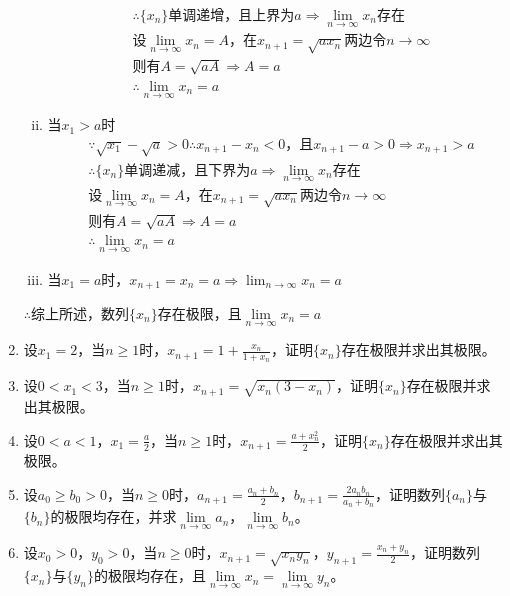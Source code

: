 \begin{enumerate}[{例}1.]
\begin{enumerate}[(i)]
\begin{align*}
                    &\therefore \{x_n\}\mbox{单调递增，且上界为}a\Rightarrow\lim_{n \to \infty}x_n\mbox{存在}\\
                    &\mbox{设}\lim_{n \to \infty}x_n=A\mbox{，在}x_{n+1}=\sqrt{ax_n}\mbox{两边令}n\to\infty\\
                    &\mbox{则有}A=\sqrt{aA}\Rightarrow A=a\\
                    &\therefore\lim_{n \to \infty}x_n=a
                \end{align*}
            \item 当$x_1>a$时
                \begin{align*}
                    &\because\sqrt{x_1}-\sqrt{a}>0\therefore x_{n+1}-x_n<0\mbox{，且}x_{n+1}-a>0\Rightarrow x_{n+1}>a\\
                    &\therefore \{x_n\}\mbox{单调递减，且下界为}a\Rightarrow\lim_{n \to \infty}x_n\mbox{存在}\\
                    &\mbox{设}\lim_{n \to \infty}x_n=A\mbox{，在}x_{n+1}=\sqrt{ax_n}\mbox{两边令}n\to\infty\\
                    &\mbox{则有}A=\sqrt{aA}\Rightarrow A=a\\
                    &\therefore\lim_{n \to \infty}x_n=a
                \end{align*}
            \item 当$x_1=a$时，$x_{n+1}=x_n=a\Rightarrow \lim_{n \to \infty}x_n=a$
        \end{enumerate}
        $\therefore$综上所述，数列$\{x_n\}$存在极限，且$\lim\limits_{n \to \infty}x_n=a$
    \item 设$x_1=2$，当$n\geq1$时，$x_{n+1}=1+\frac{x_n}{1+x_n}$，证明$\{x_n\}$存在极限并求出其极限。
    \item 设$0<x_1<3$，当$n\geq1$时，$x_{n+1}=\sqrt{x_n(3-x_n)}$，证明$\{x_n\}$存在极限并求出其极限。
    \item 设$0<a<1$，$x_1 =\frac{a}{2}$，当$n\geq1$时，$x_{n+1}=\frac{a+x_n^2}{2}$，证明$\{x_n\}$存在极限并求出其极限。
    \item 设$a_0\geq b_0>0$，当$n\geq 0$时，$a_{n+1}=\frac{a_n+b_n}{2}$，$b_{n+1}=\frac{2 a_n b_n}{a_n + b_n}$，证明数列$\{a_n\}$与$\{b_n\}$的极限均存在，并求$\lim\limits_{n\to \infty}a_n$，$\lim\limits_{n \to \infty}b_n$。
    \item 设$x_0>0$，$y_0>0$，当$n\geq 0$时，$x_{n+1}=\sqrt{x_n y_n}$，$y_{n+1}=\frac{x_n + y_n}{2}$，证明数列$\{x_n\}$与$\{y_n\}$的极限均存在，且$\lim\limits_{n\to \infty}x_n=\lim\limits_{n \to \infty}y_n$。

\end{enumerate}
